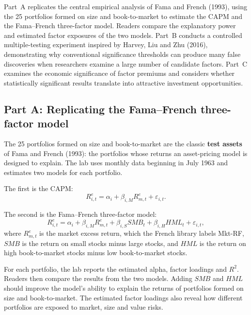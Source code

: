 Part~A replicates the central empirical analysis of Fama and French (1993), using the 25 portfolios formed on size and book-to-market to estimate the CAPM and the Fama--French three-factor model. Readers compare the explanatory power and estimated factor exposures of the two models. Part~B conducts a controlled multiple-testing experiment inspired by Harvey, Liu and Zhu (2016), demonstrating why conventional significance thresholds can produce many false discoveries when researchers examine a large number of candidate factors. Part~C examines the economic significance of factor premiums and considers whether statistically significant results translate into attractive investment opportunities.

\subsection*{Part A: Replicating the Fama--French three-factor model}

The 25 portfolios formed on size and book-to-market are the classic \textbf{test assets} of Fama and French (1993): the portfolios whose returns an asset-pricing model is designed to explain. The lab uses monthly data beginning in July 1963 and estimates two models for each portfolio.

The first is the CAPM:
\begin{equation}
  R^{e}_{i,t}
  = \alpha_i+\beta_{i,M}R^{e}_{m,t}+\varepsilon_{i,t}.
  \label{eq:03-lab-capm}
\end{equation}

The second is the Fama--French three-factor model:
\begin{equation}
  R^{e}_{i,t}
  = \alpha_i+\beta_{i,M}R^{e}_{m,t}
  +\beta_{i,S}SMB_t
  +\beta_{i,H}HML_t+\varepsilon_{i,t},
  \label{eq:03-lab-ff3}
\end{equation}
where $R^{e}_{m,t}$ is the market excess return, which the French library labels Mkt-RF, $SMB$ is the return on small stocks minus large stocks, and $HML$ is the return on high book-to-market stocks minus low book-to-market stocks.

For each portfolio, the lab reports the estimated alpha, factor loadings and $R^2$. Readers then compare the results from the two models. Adding $SMB$ and $HML$ should improve the model's ability to explain the returns of portfolios formed on size and book-to-market. The estimated factor loadings also reveal how different portfolios are exposed to market, size and value risks.

